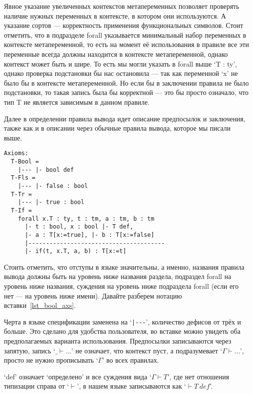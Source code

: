 Явное указание увеличенных контекстов метапеременных позволяет проверять наличие нужных переменных в контексте, в котором они используются. А указание сортов --- корректность применения функциональных символов. Стоит отметить, что в подразделе forall указывается минимальный набор переменных в контексте метапеременной, то есть на момент её использования в правиле все эти переменные всегда должны находится в контексте метапеременной, однако контекст может быть и шире. То есть мы могли указать в forall выше `T : ty', однако проверка подстановки бы нас остановила --- так как переменной `x' не было бы в контексте метапеременной. Но если бы в заключении правила не было подстановки, то такая запись была бы корректной --- это бы просто означало, что тип T не является зависимым в данном правиле.

\hfill

Далее в определении правила вывода идет описание предпосылок и заключения, также как и в описании через обычные правила вывода, которое мы писали выше.

\begin{lstlisting}[label={lst_bool_axs}, caption={Правила вывода языка Bool, описанные в языке спецификации},captionpos=b, frame=single, float]
Axioms:
  T-Bool =
    |--- |- bool def
  T-Fls =
    |--- |- false : bool
  T-Tr =
    |--- |- true : bool
  T-If =
    forall x.T : ty, t : tm, a : tm, b : tm
      |- t : bool, x : bool |- T def,
      |- a : T[x:=true], |- b : T[x:=false]
      |---------------------------------------
      |- if(t, x.T, a, b) : T[x:=t]
\end{lstlisting}

Стоить отметить, что отступы в языке значительны, а именно, названия правила вывода должны быть на уровень ниже названия раздела, подраздел forall на уровень ниже названия, суждения на уровень ниже подраздела forall (если его нет --- на уровень ниже имени). Давайте разберем нотацию вставки~\ref{lst_bool_axs}.

Черта в языке спецификации заменена на `\lstinline{|---}', количество дефисов от трёх и больше. Это сделано для удобства пользователя, во вставке можно увидеть оба предполагаемых варианта использования. Предпосылки записываются через запятую, запись `$\_ \vdash ... $' не означает, что контекст пуст, а подразумевает `$\Gamma \vdash ... $', просто не нужно прописывать `$\Gamma$' во всех правилах.

`def' означает `определено' и все суждения вида `$\Gamma \vdash T$', где нет отношения типизации справа от `$\vdash$', в нашем языке записываются как `$ \vdash T\ def$'.

